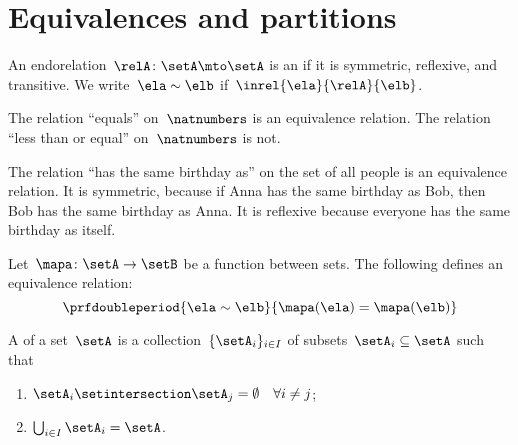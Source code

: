 
\section{Equivalences and partitions}
\begin{ctdefinition}
    \label{def:equivalence-relation}
    An endorelation~$\relA\colon \setA\mto \setA$ is an \emph{} if it is symmetric, reflexive, and transitive.
    We write~$\ela\sim \elb$ if~$\inrel{\ela}{\relA}{\elb}$.
\end{ctdefinition}

\begin{example}
    The relation ``equals'' on~$\natnumbers$ is an equivalence relation.
    The relation ``less than or equal'' on~$\natnumbers$ is not.
\end{example}

\begin{example}
    The relation ``has the same birthday as'' on the set of all people is an equivalence relation.
    It is symmetric, because if Anna has the same birthday as Bob, then Bob has the same birthday as Anna.
    It is reflexive because everyone has the same birthday as itself.
\end{example}

\begin{example}
    Let~$\mapa\colon \setA\to \setB$ be a function between sets.
    The following defines an equivalence relation:
    \begin{equation*}
        \prfdoubleperiod{
            \ela\sim \elb
        }{
            \mapa(\ela)=\mapa(\elb)
        }
    \end{equation*}
\end{example}

\begin{ctdefinition}[Partition]
    \label{def:partition}
    A \emph{} of a set~$\setA$ is a collection~$\{\setA_i\}_{i\in I}$ of subsets~$\setA_i\subseteq \setA$ such that
    \begin{enumerate}
        \item $\setA_i\setintersection \setA_j=\emptyset \quad \forall i\neq j$;
        \item $\bigcup_{i\in I}\setA_i=\setA$.
    \end{enumerate}
\end{ctdefinition}

